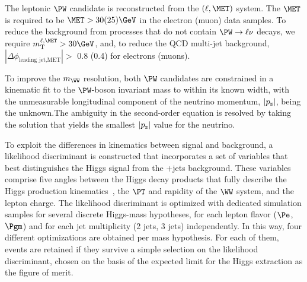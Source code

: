 The leptonic $\PW$ candidate is reconstructed from the $(\ell,\MET)$
system. 
The $\MET$ is required to be $\MET>30(25)\GeV$
in the electron (muon) data samples. 
To reduce the background from processes that do not
contain $\PW\to\ell\nu$ decays, we require $m_{\rm{T}}^{\ell,\MET}>30\GeV$,
and,
to reduce the QCD multi-jet background,
$|\Delta\phi_{\textrm{leading jet,MET}}| >$ 0.8 (0.4) for
electrons (muons).

To improve the $m_{\WW}$ resolution, both $\PW$ candidates are constrained
in a kinematic fit to the $\PW$-boson invariant mass to within its known
width, with the unmeasurable longitudinal component of the neutrino
momentum, $|p_{\textnormal{z}}|$, being the unknown.The ambiguity in
the second-order equation is resolved by taking the solution that
yields the smallest $|p_{\textnormal{z}}|$ value for the neutrino.  

To exploit the differences in kinematics between signal and
background, a likelihood discriminant is constructed that incorporates
a set of variables that best distinguishes the Higgs signal from the
\PW+jets background. 
These variables
comprise five angles between the Higgs decay products that fully
describe the Higgs production kinematics~\cite{Gao:2010qx}, the $\PT$
and rapidity of the $\WW$ system, and the lepton charge.
The likelihood discriminant is optimized with dedicated simulation
samples for several discrete Higgs-mass hypotheses, for each lepton
flavor ($\Pe$, $\Pgm$) and for each jet multiplicity (2 jets, 3 jets)
independently.  In this way, four different optimizations are obtained
per mass hypothesis.  For each of them, events are retained if they
survive a simple selection on the likelihood discriminant, chosen on
the basis of the expected limit for the Higgs extraction as the figure
of merit.

